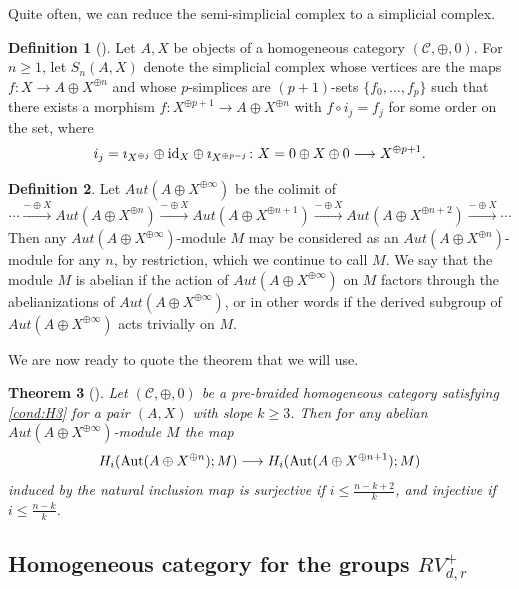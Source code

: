 \documentclass[11pt, a4paper]{amsart}
\newtheorem{thm}{Theorem}[section]
\theoremstyle{definition}
\newtheorem{defn}[thm]{Definition} %
\newcommand{\id}{{{\rm id}}}
\begin{document}
Quite often, we can reduce the semi-simplicial complex to a simplicial complex. 

\begin{defn}[{\cite[Definition 2.8]{RWW17}}] \label{defn:Sn(X,A)}
Let $A,X$ be objects of a homogeneous category $(\mathcal{C}, \oplus,0)$. For $n \geq 1$, let $S_n(A,X)$ denote the simplicial complex whose vertices are the maps $f\colon X \to A\oplus X^{\oplus n}$ and whose $p$-simplices are $(p+1)$-sets $\{ f_0, \dots, f_p\}$ such that there exists a morphism $f\colon X^{\oplus p+1} \to A\oplus X^{\oplus n}$ with $f \circ i_j = f_j$ for some order on the set, where
\[ i_j =  \imath_{X^{\oplus j}} \oplus \id_X \oplus \imath_{X^{\oplus p-j}}  \colon X = 0 \oplus X \oplus 0 \longrightarrow X^{\oplus p+1}. \]
\end{defn}


\begin{defn}
Let $Aut(A\oplus X^{\oplus \infty})$ be the colimit of 
$$ \cdots \xrightarrow[]{-\oplus X} Aut(A\oplus X^{\oplus n}) \xrightarrow[]{-\oplus X} Aut(A\oplus X^{\oplus n+1}) \xrightarrow[]{-\oplus X} Aut(A\oplus X^{\oplus n+2})\xrightarrow[]{-\oplus X}\cdots $$
Then any $Aut(A\oplus X^{\oplus \infty})$-module $M$ may be considered as an $Aut(A\oplus X^{\oplus n})$-module for any $n$, by restriction, which we continue to call $M$. We say that the module $M$ is abelian if the action of $Aut(A\oplus X^{\oplus \infty})$ on $M$ factors through the abelianizations of $Aut(A\oplus X^{\oplus \infty})$, or in other words if the derived subgroup of $Aut(A\oplus X^{\oplus \infty})$ acts trivially on $M$.  
\end{defn}

We are now ready to quote the theorem that we will use.
\begin{thm}[{\cite[Theorem 3.4]{RWW17}}] \label{thm:hom stab}
Let $(\mathcal{C}, \oplus,0)$ be a pre-braided homogeneous category satisfying \ref{cond:H3} for a pair $(A,X)$ with slope $k \geq 3$. Then for any abelian $Aut(A\oplus X^{\oplus \infty})$-module $M$ the map
\[H_i({\mathrm{Aut}}(A\oplus X^{\oplus n}); M )  \longrightarrow H_i({\mathrm{Aut}}(A\oplus X^{\oplus n+1}); M)\]
induced by the natural inclusion map is surjective if  $i \leq \frac{n-k+2}{k}$, and injective if  $i \leq \frac{n-k}{k}$.
\end{thm}







\subsection{Homogeneous category for the groups $RV^+_{d,r}$}
\end{document}
